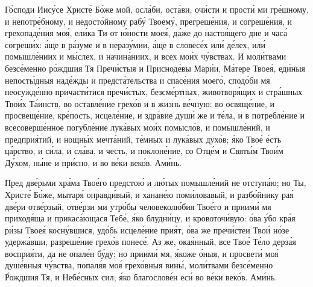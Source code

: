 \begin{mymulticols}

Г\'{о}споди Иис\'{у}се Христ\'{е} Б\'{о}же мой, осл\'{а}би, ост\'{а}ви, оч\'{и}сти и прост\'{и} ми гр\'{е}шному, и непотр\'{е}бному, и недост\'{о}йному раб\'{у} Твоем\'{у}, прегреш\'{е}ния, и согреш\'{е}ния, и грехопад\'{е}ния мо\'{я}, ел\'{и}ка Ти от \'{ю}ности мое\'{я}, д\'{а}же до насто\'{я}щего дне и час\'{а} согреш\'{и}х: \'{а}ще в р\'{а}зуме и в нераз\'{у}мии, \'{а}ще в словес\'{е}х ил\'{и} д\'{е}лех, ил\'{и} помышл\'{е}ниих и м\'{ы}слех, и начин\'{а}ниих, и всех мо\'{и}х ч\'{у}вствах. И мол\'{и}твами безс\'{е}менно р\'{о}ждшия Тя Преч\'{и}стыя и Приснод\'{е}вы Мар\'{и}и, М\'{а}тере Твое\'{я}, ед\'{и}ныя непост\'{ы}дныя над\'{е}жды и предст\'{а}тельства и спас\'{е}ния моег\'{о}, спод\'{о}би мя неосужд\'{е}нно причаст\'{и}тися преч\'{и}стых, безсм\'{е}ртных, животвор\'{я}щих и стр\'{а}шных Тво\'{и}х Т\'{а}инств, во оставл\'{е}ние грех\'{о}в и в жизнь в\'{е}чную: во освящ\'{е}ние, и просвещ\'{е}ние, кр\'{е}пость, исцел\'{е}ние, и здр\'{а}вие душ\'{и} же и т\'{е}ла, и в потребл\'{е}ние и всесоверш\'{е}нное погубл\'{е}ние лук\'{а}вых мо\'{и}х помысл\'{о}в, и помышл\'{е}ний, и предпри\'{я}тий, и нощн\'{ы}х мечт\'{а}ний, т\'{е}мных и лук\'{а}вых дух\'{о}в; \'{я}ко Тво\'{е} \'{е}сть ц\'{а}рство, и с\'{и}ла, и сл\'{а}ва, и честь, и поклон\'{е}ние, со Отц\'{е}м и Свят\'{ы}м Тво\'{и}м Д\'{у}хом, н\'{ы}не и пр\'{и}сно, и во в\'{е}ки век\'{о}в. Ам\'{и}нь.


Пред дв\'{е}рьми хр\'{а}ма Тво\'{е}го предсто\'{ю} и л\'{ю}тых помышл\'{е}ний не отступ\'{а}ю; но Ты, Христ\'{е} Б\'{о}же, мытар\'{я} оправд\'{и}вый, и ханан\'{е}ю пом\'{и}ловавый, и разб\'{о}йнику ра\'{я} дв\'{е}ри отв\'{е}рзый, отв\'{е}рзи ми утр\'{о}бы человекол\'{ю}бия Тво\'{е}го и приим\'{и} мя приход\'{я}ща и прикас\'{а}ющася Теб\'{е}, \'{я}ко блудн\'{и}цу, и кровоточ\'{и}вую: \'{о}ва \'{у}бо кр\'{а}я р\'{и}зы Твое\'{я} косн\'{у}вшися, уд\'{о}бь исцел\'{е}ние при\'{я}т, \'{о}ва же преч\'{и}стеи Тво\'{и} н\'{о}зе удерж\'{а}вши, разреш\'{е}ние грех\'{о}в понес\'{е}. Аз же, ока\'{я}нный, все Тво\'{е} Т\'{е}ло дерз\'{а}я воспри\'{я}ти, да не опал\'{е}н б\'{у}ду; но приим\'{и} мя, \'{я}коже \'{о}ныя, и просвет\'{и} мо\'{я} душ\'{е}вныя ч\'{у}вства, попал\'{я}я мо\'{я} грех\'{о}вныя вин\'{ы}, мол\'{и}твами безс\'{е}менно \'{Р}ождшия Тя, и Неб\'{е}сных сил; \'{я}ко благослов\'{е}н ес\'{и} во в\'{е}ки век\'{о}в. Ам\'{и}нь.



\end{mymulticols}
